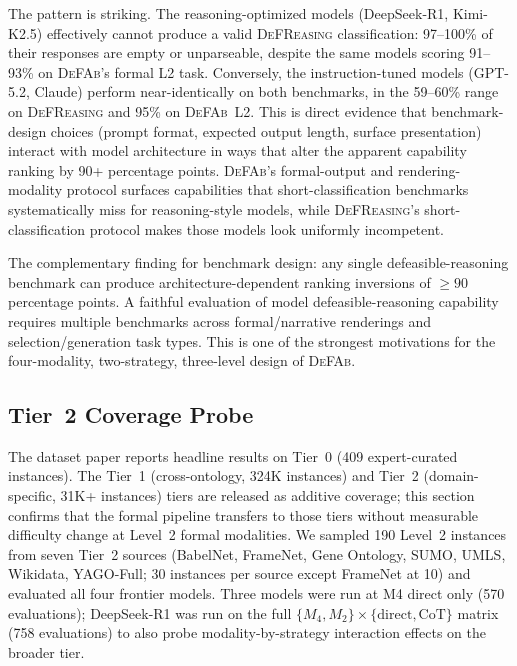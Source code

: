 \documentclass{article}
\theoremstyle{definition}
\begin{document}
The pattern is striking. The reasoning-optimized models (DeepSeek-R1, Kimi-K2.5) effectively cannot produce a valid \textsc{DeFReasing} classification: 97--100\% of their responses are empty or unparseable, despite the same models scoring 91--93\% on \textsc{DeFAb}'s formal L2 task. Conversely, the instruction-tuned models (GPT-5.2, Claude) perform near-identically on both benchmarks, in the 59--60\% range on \textsc{DeFReasing} and 95\% on \textsc{DeFAb}~L2. This is direct evidence that benchmark-design choices (prompt format, expected output length, surface presentation) interact with model architecture in ways that alter the apparent capability ranking by 90+ percentage points. \textsc{DeFAb}'s formal-output and rendering-modality protocol surfaces capabilities that short-classification benchmarks systematically miss for reasoning-style models, while \textsc{DeFReasing}'s short-classification protocol makes those models look uniformly incompetent.

The complementary finding for benchmark design: any single defeasible-reasoning benchmark can produce architecture-dependent ranking inversions of $\geq 90$ percentage points. A faithful evaluation of model defeasible-reasoning capability requires multiple benchmarks across formal/narrative renderings and selection/generation task types. This is one of the strongest motivations for the four-modality, two-strategy, three-level design of \textsc{DeFAb}.


\subsection{Tier~2 Coverage Probe}\label{subsec:tier2_results}

The dataset paper reports headline results on Tier~0 (409 expert-curated instances). The Tier~1 (cross-ontology, 324K instances) and Tier~2 (domain-specific, 31K+ instances) tiers are released as additive coverage; this section confirms that the formal pipeline transfers to those tiers without measurable difficulty change at Level~2 formal modalities. We sampled 190 Level~2 instances from seven Tier~2 sources (BabelNet, FrameNet, Gene Ontology, SUMO, UMLS, Wikidata, YAGO-Full; 30 instances per source except FrameNet at 10) and evaluated all four frontier models. Three models were run at M4 direct only (570 evaluations); DeepSeek-R1 was run on the full $\{M_4, M_2\} \times \{\text{direct}, \text{CoT}\}$ matrix (758 evaluations) to also probe modality-by-strategy interaction effects on the broader tier.
\end{document}
